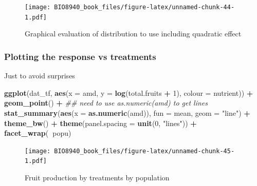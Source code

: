 \documentclass[
  12pt,
]{book}
\newenvironment{Shaded}{\begin{snugshade}}{\end{snugshade}}
\newcommand{\CommentTok}[1]{\textcolor[rgb]{0.56,0.35,0.01}{\textit{#1}}}
\newcommand{\DataTypeTok}[1]{\textcolor[rgb]{0.13,0.29,0.53}{#1}}
\newcommand{\DecValTok}[1]{\textcolor[rgb]{0.00,0.00,0.81}{#1}}
\newcommand{\KeywordTok}[1]{\textcolor[rgb]{0.13,0.29,0.53}{\textbf{#1}}}
\newcommand{\NormalTok}[1]{#1}
\newcommand{\OperatorTok}[1]{\textcolor[rgb]{0.81,0.36,0.00}{\textbf{#1}}}
\newcommand{\StringTok}[1]{\textcolor[rgb]{0.31,0.60,0.02}{#1}}
\begin{document}
\begin{figure}
\centering
\texttt{[image: BIO8940\_book\_files/figure-latex/unnamed-chunk-44-1.pdf]}
\caption{\label{fig:unnamed-chunk-44}Graphical evaluation of distribution to use including quadratic effect}
\end{figure}

\hypertarget{plotting-the-response-vs-treatments}{%
\subsubsection{Plotting the response vs treatments}\label{plotting-the-response-vs-treatments}}

Just to avoid surprises

\begin{Shaded}
\begin{Highlighting}[]
\KeywordTok{ggplot}\NormalTok{(dat_tf, }\KeywordTok{aes}\NormalTok{(}\DataTypeTok{x =}\NormalTok{ amd, }\DataTypeTok{y =} \KeywordTok{log}\NormalTok{(total.fruits }\OperatorTok{+}\StringTok{ }\DecValTok{1}\NormalTok{), }\DataTypeTok{colour =}\NormalTok{ nutrient)) }\OperatorTok{+}
\StringTok{  }\KeywordTok{geom_point}\NormalTok{() }\OperatorTok{+}
\StringTok{  }\CommentTok{## need to use as.numeric(amd) to get lines}
\StringTok{  }\KeywordTok{stat_summary}\NormalTok{(}\KeywordTok{aes}\NormalTok{(}\DataTypeTok{x =} \KeywordTok{as.numeric}\NormalTok{(amd)), }\DataTypeTok{fun =}\NormalTok{ mean, }\DataTypeTok{geom =} \StringTok{"line"}\NormalTok{) }\OperatorTok{+}
\StringTok{  }\KeywordTok{theme_bw}\NormalTok{() }\OperatorTok{+}
\StringTok{  }\KeywordTok{theme}\NormalTok{(}\DataTypeTok{panel.spacing =} \KeywordTok{unit}\NormalTok{(}\DecValTok{0}\NormalTok{, }\StringTok{"lines"}\NormalTok{)) }\OperatorTok{+}
\StringTok{  }\KeywordTok{facet_wrap}\NormalTok{(}\OperatorTok{~}\NormalTok{popu)}
\end{Highlighting}
\end{Shaded}

\begin{figure}
\centering
\texttt{[image: BIO8940\_book\_files/figure-latex/unnamed-chunk-45-1.pdf]}
\caption{\label{fig:unnamed-chunk-45}Fruit production by treatments by population}
\end{figure}
\end{document}
